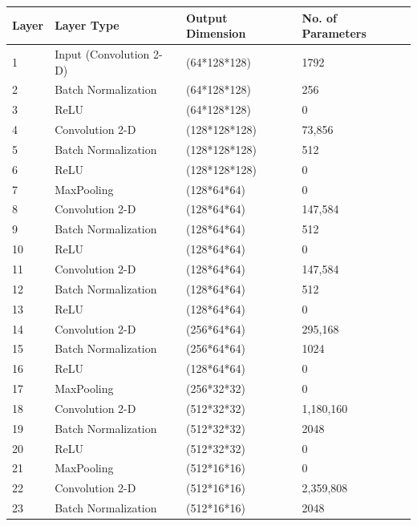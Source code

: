 	\clearpage
	\begin{table}
		\begin{tabular}{|l|l|l|l|}
		\hline
		\textbf{Layer} & \textbf{Layer Type} & \textbf{Output Dimension} & \textbf{No. of Parameters} \\ \hline
		1 & Input (Convolution 2-D) & (64*128*128) & 1792 \\ \hline
		2 & Batch Normalization & (64*128*128) & 256 \\      \hline
		3 & ReLU & (64*128*128) & 0 \\                       \hline
		4 & Convolution 2-D & (128*128*128) & 73,856 \\        \hline
		5 & Batch Normalization & (128*128*128) & 512 \\     \hline
		6 & ReLU & (128*128*128) & 0 \\                      \hline
		7 & MaxPooling & (128*64*64) & 0 \\                  \hline
		8 & Convolution 2-D & (128*64*64) & 147,584 \\          \hline
		9 & Batch Normalization & (128*64*64) & 512 \\       \hline
		10 & ReLU & (128*64*64) & 0 \\                       \hline
		11 & Convolution 2-D & (128*64*64) & 147,584 \\         \hline
		12 & Batch Normalization & (128*64*64) & 512 \\      \hline
		13 & ReLU & (128*64*64) & 0 \\                       \hline
		14 & Convolution 2-D & (256*64*64) & 295,168 \\         \hline
		15 & Batch Normalization & (256*64*64) & 1024 \\     \hline
		16 & ReLU & (128*64*64) & 0 \\                       \hline
		17 & MaxPooling & (256*32*32) & 0 \\                 \hline
		18 & Convolution 2-D & (512*32*32) & 1,180,160 \\        \hline
		19 & Batch Normalization & (512*32*32) & 2048 \\     \hline
		20 & ReLU & (512*32*32) & 0 \\                       \hline
		21 & MaxPooling & (512*16*16) & 0 \\                 \hline
		22 & Convolution 2-D & (512*16*16) & 2,359,808 \\        \hline
		23 & Batch Normalization & (512*16*16) & 2048 \\     \hline

\end{tabular}
\end{table}
